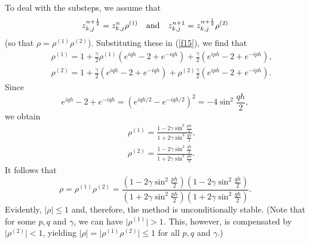 \vskip 0.3cm
 
To deal with the substeps, we assume that
\[
z^{n+\frac{1}{2}}_{k,j}=z^{n}_{k,j}\rho^{(1)} \quad {\rm and}\quad
z^{n+1}_{k,j}=z^{n+\frac{1}{2}}_{k,j}\rho^{(2)}
\]
(so that $\rho=\rho^{(1)}\rho^{(2)}$). Substituting these in
(\ref{f15}), we find that
\begin{eqnarray}
&&\rho^{(1)}=1+\frac{\gamma}{2}
\rho^{(1)}\left(e^{iqh}-2+e^{-iqh}\right)
+\frac{\gamma}{2}\left(e^{iph}-2+e^{-iph}\right), \nonumber \\
&&\rho^{(2)}=1+\frac{\gamma}{2}
\left(e^{iqh}-2+e^{-iqh}\right)
+\rho^{(2)}\frac{\gamma}{2}\left(e^{iph}-2+e^{-iph}\right). \nonumber
\end{eqnarray}
Since
\[
e^{iqh}-2+e^{-iqh}=\left(e^{iqh/2}-e^{-iqh/2}\right)^{2}=-4\sin^{2} \frac{qh}{2},
\]
we obtain
\begin{eqnarray}
&&\rho^{(1)}=\frac{1-2\gamma\sin^{2} \frac{ph}{2}}
{1+2\gamma\sin^{2} \frac{qh}{2}}, \nonumber \\
&&\rho^{(2)}=\frac{1-2\gamma\sin^{2} \frac{qh}{2}}
{1+2\gamma\sin^{2} \frac{ph}{2}}. \nonumber
\end{eqnarray}
It follows that
\[
\rho=\rho^{(1)}\rho^{(2)}
=\frac{\left(1-2\gamma\sin^{2} \frac{ph}{2}\right)
\left(1-2\gamma\sin^{2} \frac{qh}{2}\right)}
{\left(1+2\gamma\sin^{2} \frac{ph}{2}\right)
\left(1+2\gamma\sin^{2} \frac{qh}{2} \right)}.
\]
Evidently, $\vert\rho\vert\leq 1$ and, therefore,
the method is unconditionally stable. (Note that for some $p,q$ and $\gamma$, we can have $\vert\rho^{(1)}\vert >1$.
This, however,
is compensated by $\vert\rho^{(2)}\vert <1$, yielding $\vert\rho\vert=\vert\rho^{(1)}\rho^{(2)}\vert\leq 1$
for all $p,q$ and $\gamma$.)
